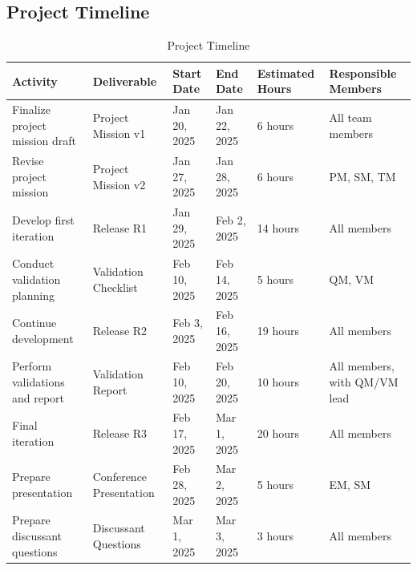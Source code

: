 \documentclass[a4paper]{article}
\begin{document}
\subsection{Project Timeline}
\begin{table}[h!]
\centering
\begin{tabular}{|l|l|l|l|l|l|}
\hline
\textbf{Activity}                   & \textbf{Deliverable}         & \textbf{Start Date} & \textbf{End Date} & \textbf{Estimated Hours} & \textbf{Responsible Members}      \\ \hline
Finalize project mission draft      & Project Mission v1           & Jan 20, 2025        & Jan 22, 2025      & 6 hours                  & All team members                  \\ \hline
Revise project mission              & Project Mission v2           & Jan 27, 2025        & Jan 28, 2025      & 6 hours                  & PM, SM, TM                        \\ \hline
Develop first iteration             & Release R1                   & Jan 29, 2025        & Feb 2, 2025       & 14 hours                 & All members                       \\ \hline
Conduct validation planning         & Validation Checklist         & Feb 10, 2025        & Feb 14, 2025      & 5 hours                  & QM, VM                            \\ \hline
Continue development                & Release R2                   & Feb 3, 2025         & Feb 16, 2025      & 19 hours                 & All members                       \\ \hline
Perform validations and report      & Validation Report            & Feb 10, 2025        & Feb 20, 2025      & 10 hours                 & All members, with QM/VM lead      \\ \hline
Final iteration                     & Release R3                   & Feb 17, 2025        & Mar 1, 2025       & 20 hours                 & All members                       \\ \hline
Prepare presentation                & Conference Presentation      & Feb 28, 2025        & Mar 2, 2025       & 5 hours                  & EM, SM                            \\ \hline
Prepare discussant questions        & Discussant Questions         & Mar 1, 2025         & Mar 3, 2025       & 3 hours                  & All members                       \\ \hline
\end{tabular}
\caption{Project Timeline}
\label{tab:project_timeline}
\end{table}
\end{document}

